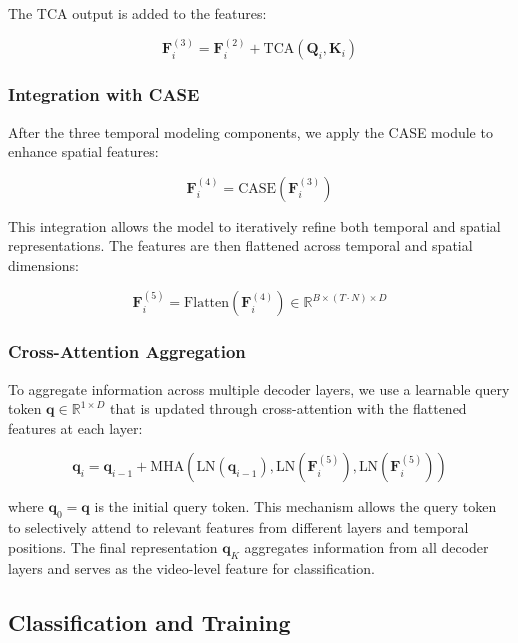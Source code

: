 The TCA output is added to the features:

\begin{equation}
\mathbf{F}_i^{(3)} = \mathbf{F}_i^{(2)} + \text{TCA}(\mathbf{Q}_i, \mathbf{K}_i)
\end{equation}

\subsubsection{Integration with CASE}

After the three temporal modeling components, we apply the CASE module to enhance spatial features:

\begin{equation}
\mathbf{F}_i^{(4)} = \text{CASE}(\mathbf{F}_i^{(3)})
\end{equation}

This integration allows the model to iteratively refine both temporal and spatial representations. The features are then flattened across temporal and spatial dimensions:

\begin{equation}
\mathbf{F}_i^{(5)} = \text{Flatten}(\mathbf{F}_i^{(4)}) \in \mathbb{R}^{B \times (T \cdot N) \times D}
\end{equation}

\subsubsection{Cross-Attention Aggregation}

To aggregate information across multiple decoder layers, we use a learnable query token $\mathbf{q} \in \mathbb{R}^{1 \times D}$ that is updated through cross-attention with the flattened features at each layer:

\begin{equation}
\mathbf{q}_i = \mathbf{q}_{i-1} + \text{MHA}(\text{LN}(\mathbf{q}_{i-1}), \text{LN}(\mathbf{F}_i^{(5)}), \text{LN}(\mathbf{F}_i^{(5)}))
\end{equation}

where $\mathbf{q}_0 = \mathbf{q}$ is the initial query token. This mechanism allows the query token to selectively attend to relevant features from different layers and temporal positions. The final representation $\mathbf{q}_K$ aggregates information from all decoder layers and serves as the video-level feature for classification.

\subsection{Classification and Training}


